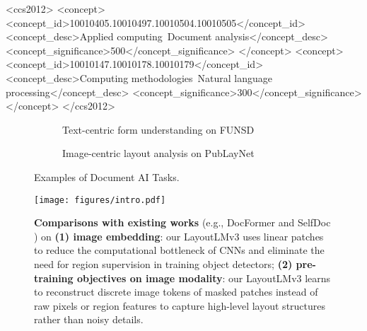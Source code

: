 \documentclass[sigconf]{acmart}
\begin{document}
\begin{CCSXML}
<ccs2012>
<concept>
<concept_id>10010405.10010497.10010504.10010505</concept_id>
<concept_desc>Applied computing~Document analysis</concept_desc>
<concept_significance>500</concept_significance>
</concept>
<concept>
<concept_id>10010147.10010178.10010179</concept_id>
<concept_desc>Computing methodologies~Natural language processing</concept_desc>
<concept_significance>300</concept_significance>
</concept>
</ccs2012>
\end{CCSXML}




\maketitle



\begin{figure}[t]
\centering
    \begin{subfigure}[b]{0.45\linewidth}
        \caption{Text-centric form understanding on FUNSD}
        \label{fig:1a}
    \end{subfigure}
    \qquad
\begin{subfigure}[b]{0.44\linewidth}
        \caption{Image-centric layout analysis on PubLayNet}
        \label{fig:1b}
    \end{subfigure}
    \caption{Examples of Document AI Tasks.}
    \label{fig:1}
\end{figure} 

\begin{figure}[t]
    \centering
    \texttt{[image: figures/intro.pdf]}
    \caption{\textbf{Comparisons with existing works} (e.g., DocFormer \protect\cite{Appalaraju_2021_ICCV} and SelfDoc \protect\cite{li2021selfdoc}) on
    \textbf{(1) image embedding}: our LayoutLMv3 uses linear patches to reduce the computational bottleneck of CNNs and eliminate the need for region supervision in training object detectors;
    \textbf{(2) pre-training objectives on image modality}: our LayoutLMv3 learns to reconstruct discrete image tokens of masked patches instead of raw pixels or region features to capture high-level layout structures rather than noisy details.
    } \label{fig:intro}
\end{figure}
\end{document}
